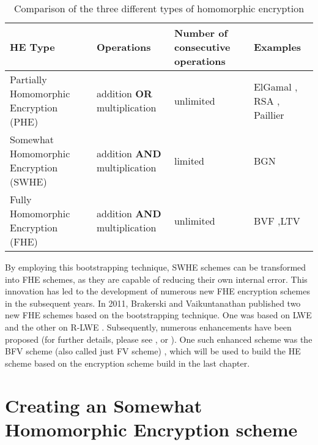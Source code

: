 \begin{table}
  \caption{Comparison of the three different types of homomorphic encryption}
  \label{table:HeTypeComparison}
  \begin{tabular}{|p{5cm}|p{2.8cm}|p{2.1cm}|p{3cm}|}
    \toprule
    HE Type                                         & Operations                           & Number of consecutive operations & Examples                                                                           \\
    \midrule
    Partially Homomorphic \newline Encryption (PHE) & addition \textbf{OR} multiplication  & unlimited                        & ElGamal \cite{ElGamal}, \newline RSA \cite{RSA}, \newline Paillier \cite{Paillier} \\
    \midrule
    Somewhat Homomorphic \newline Encryption (SWHE) & addition \textbf{AND} multiplication & limited                          & BGN \cite{BGN}                                                                     \\
    \midrule
    Fully Homomorphic \newline Encryption (FHE)     & addition \textbf{AND} multiplication & unlimited                        & BVF \cite{bfv},\newline LTV \cite{LTV}                                             \\
    \bottomrule
  \end{tabular}
\end{table}

By employing this bootstrapping technique, SWHE schemes can be transformed into FHE schemes, as they are capable of reducing their own internal error. This innovation has led to the development of numerous new FHE encryption schemes in the subsequent years. In 2011, Brakerski and Vaikuntanathan published two new FHE schemes based on the bootstrapping technique. One was based on LWE \cite{FirstLweFHE} and the other on R-LWE \cite{FirstRLweFHE}. Subsequently, numerous enhancements have been proposed (for further details, please see \cite{SurveyOfHomomorphicEncryption}, \cite{FheImplementations} or \cite{FHESurvey}). One such enhanced scheme was the BFV scheme (also called just FV scheme) \cite{bfv}, which will be used to build the HE scheme based on the encryption scheme build in the last chapter.


\section{Creating an Somewhat Homomorphic Encryption scheme}

